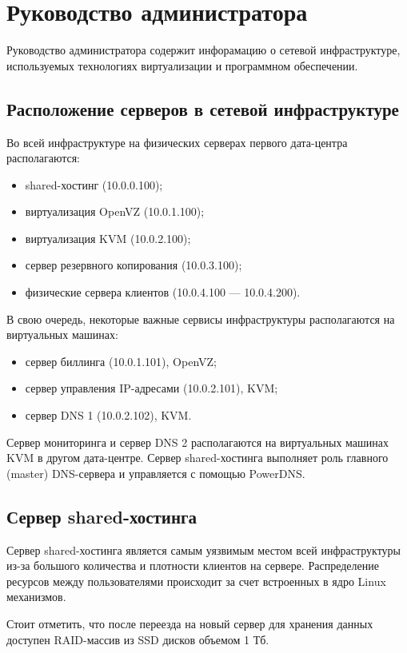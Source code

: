 \section{Руководство администратора}

Руководство администратора содержит инфорамацию о сетевой инфраструктуре, используемых технологиях виртуализации и программном обеспечении.

\subsection{Расположение серверов в сетевой инфраструктуре}
Во всей инфраструктуре на физических серверах первого дата-центра располагаются:
\begin{itemize}
  \item shared-хостинг (10.0.0.100);
  \item виртуализация OpenVZ (10.0.1.100);
  \item виртуализация KVM (10.0.2.100);
  \item сервер резервного копирования (10.0.3.100);
  \item физические сервера клиентов (10.0.4.100 --- 10.0.4.200).
\end{itemize}

В свою очередь, некоторые важные сервисы инфраструктуры располагаются на виртуальных машинах:
\begin{itemize}
  \item сервер биллинга (10.0.1.101), OpenVZ;
  \item сервер управления IP-адресами (10.0.2.101), KVM;
  \item сервер DNS 1 (10.0.2.102), KVM.
\end{itemize}

Сервер мониторинга и сервер DNS 2 располагаются на виртуальных машинах KVM в другом дата-центре.
Сервер shared-хостинга выполняет роль главного (master) DNS-сервера и управляется с помощью PowerDNS.

\subsection{Сервер shared-хостинга}

Сервер shared-хостинга является самым уязвимым местом всей инфраструктуры из-за большого количества и плотности клиентов на сервере.
Распределение ресурсов между пользователями происходит за счет встроенных в ядро Linux механизмов.

Стоит отметить, что после переезда на новый сервер для хранения данных доступен RAID-массив из SSD дисков объемом 1 Тб.

